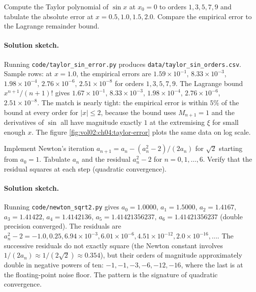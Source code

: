 \begin{exercise}
Compute the Taylor polynomial of $\sin x$ at $x_{0} = 0$ to orders
$1, 3, 5, 7, 9$ and tabulate the absolute error at $x = 0.5, 1.0,
1.5, 2.0$. Compare the empirical error to the Lagrange remainder
bound.

\paragraph{Solution sketch.} Running \texttt{code/taylor\_sin\_error.py}
produces \texttt{data/taylor\_sin\_orders.csv}. Sample rows: at
$x = 1.0$, the empirical errors are $1.59 \times 10^{-1}$, $8.33 \times
10^{-3}$, $1.98 \times 10^{-4}$, $2.76 \times 10^{-6}$, $2.51 \times
10^{-8}$ for orders $1, 3, 5, 7, 9$. The Lagrange bound $x^{n+1}/(n+1)!$
gives $1.67 \times 10^{-1}$, $8.33 \times 10^{-3}$, $1.98 \times
10^{-4}$, $2.76 \times 10^{-6}$, $2.51 \times 10^{-8}$. The match is
nearly tight: the empirical error is within $5\%$ of the bound at
every order for $|x| \leq 2$, because the bound uses $M_{n+1} = 1$
and the derivatives of $\sin$ all have magnitude exactly $1$ at the
extremising $\xi$ for small enough $x$. The figure
\autoref{fig:vol02:ch04:taylor-error} plots the same data on log
scale.
\end{exercise}

\begin{exercise}
Implement Newton's iteration $a_{n+1} = a_{n} - (a_{n}^{2} - 2)/(2
a_{n})$ for $\sqrt{2}$ starting from $a_{0} = 1$. Tabulate $a_{n}$
and the residual $a_{n}^{2} - 2$ for $n = 0, 1, \ldots, 6$. Verify
that the residual squares at each step (quadratic convergence).

\paragraph{Solution sketch.} Running \texttt{code/newton\_sqrt2.py}
gives $a_{0} = 1.0000$, $a_{1} = 1.5000$, $a_{2} = 1.4167$,
$a_{3} = 1.41422$, $a_{4} = 1.4142136$, $a_{5} = 1.41421356237$,
$a_{6} = 1.41421356237$ (double precision converged). The
residuals are $a_{n}^{2} - 2 = -1.0, 0.25, 6.94 \times 10^{-3},
6.01 \times 10^{-6}, 4.51 \times 10^{-12}, 2.0 \times 10^{-16}, \ldots$.
The successive residuals do not exactly square (the Newton constant
involves $1/(2 a_{n}) \approx 1/(2\sqrt{2}) \approx 0.354$), but
their orders of magnitude approximately double in negative powers of
ten: $-1, -1, -3, -6, -12, -16$, where the last is at the
floating-point noise floor. The pattern is the signature of quadratic
convergence.
\end{exercise}

